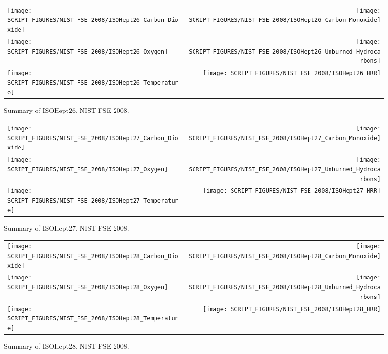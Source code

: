 \begin{figure}[p]
\begin{tabular*}{\textwidth}{l@{\extracolsep{\fill}}r}
\texttt{[image: SCRIPT\_FIGURES/NIST\_FSE\_2008/ISOHept26\_Carbon\_Dioxide]} &
\texttt{[image: SCRIPT\_FIGURES/NIST\_FSE\_2008/ISOHept26\_Carbon\_Monoxide]} \\
\texttt{[image: SCRIPT\_FIGURES/NIST\_FSE\_2008/ISOHept26\_Oxygen]} &
\texttt{[image: SCRIPT\_FIGURES/NIST\_FSE\_2008/ISOHept26\_Unburned\_Hydrocarbons]} \\
\texttt{[image: SCRIPT\_FIGURES/NIST\_FSE\_2008/ISOHept26\_Temperature]} &
\texttt{[image: SCRIPT\_FIGURES/NIST\_FSE\_2008/ISOHept26\_HRR]}
\end{tabular*}
\caption[Summary of ISOHept26, NIST FSE 2008]{Summary of ISOHept26, NIST FSE 2008.}
\label{NIST_FSE_1994_ISOHept26}
\end{figure}

\begin{figure}[p]
\begin{tabular*}{\textwidth}{l@{\extracolsep{\fill}}r}
\texttt{[image: SCRIPT\_FIGURES/NIST\_FSE\_2008/ISOHept27\_Carbon\_Dioxide]} &
\texttt{[image: SCRIPT\_FIGURES/NIST\_FSE\_2008/ISOHept27\_Carbon\_Monoxide]} \\
\texttt{[image: SCRIPT\_FIGURES/NIST\_FSE\_2008/ISOHept27\_Oxygen]} &
\texttt{[image: SCRIPT\_FIGURES/NIST\_FSE\_2008/ISOHept27\_Unburned\_Hydrocarbons]} \\
\texttt{[image: SCRIPT\_FIGURES/NIST\_FSE\_2008/ISOHept27\_Temperature]} &
\texttt{[image: SCRIPT\_FIGURES/NIST\_FSE\_2008/ISOHept27\_HRR]}
\end{tabular*}
\caption[Summary of ISOHept27, NIST FSE 2008]{Summary of ISOHept27, NIST FSE 2008.}
\label{NIST_FSE_1994_ISOHept27}
\end{figure}

\begin{figure}[p]
\begin{tabular*}{\textwidth}{l@{\extracolsep{\fill}}r}
\texttt{[image: SCRIPT\_FIGURES/NIST\_FSE\_2008/ISOHept28\_Carbon\_Dioxide]} &
\texttt{[image: SCRIPT\_FIGURES/NIST\_FSE\_2008/ISOHept28\_Carbon\_Monoxide]} \\
\texttt{[image: SCRIPT\_FIGURES/NIST\_FSE\_2008/ISOHept28\_Oxygen]} &
\texttt{[image: SCRIPT\_FIGURES/NIST\_FSE\_2008/ISOHept28\_Unburned\_Hydrocarbons]} \\
\texttt{[image: SCRIPT\_FIGURES/NIST\_FSE\_2008/ISOHept28\_Temperature]} &
\texttt{[image: SCRIPT\_FIGURES/NIST\_FSE\_2008/ISOHept28\_HRR]}
\end{tabular*}
\caption[Summary of ISOHept28, NIST FSE 2008]{Summary of ISOHept28, NIST FSE 2008.}
\label{NIST_FSE_1994_ISOHept28}
\end{figure}


